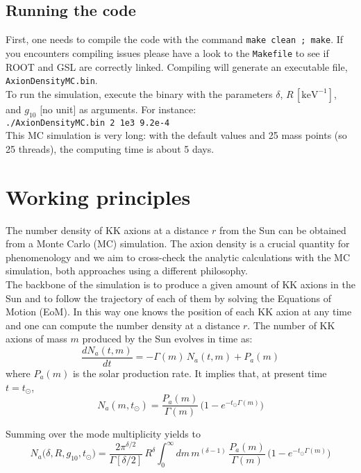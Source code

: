 \documentclass[a4paper]{article} %
\begin{document}
\subsection{Running the code}

First, one needs to compile the code with the command \texttt{make clean ; make}. If you encounters compiling issues please have a look to the \texttt{Makefile} to see if ROOT and GSL are correctly linked. Compiling will generate an executable file, \texttt{AxionDensityMC.bin}.\\

To run the simulation, execute the binary with the parameters $\delta$, $R\,\mathrm{[keV^{-1}]}$, and $g_{10}$ [no unit] as arguments. For instance:\\
\texttt{./AxionDensityMC.bin 2 1e3 9.2e-4}\\

This MC simulation is very long: with the default values and 25 mass points (so 25 threads), the computing time is about 5 days.

\section{Working principles}

The number density of KK axions at a distance $r$ from the Sun can be obtained from a Monte Carlo (MC) simulation. The axion density is a crucial quantity for phenomenology and we aim to cross-check the analytic calculations with the MC simulation, both approaches using a different philosophy.\\

The backbone of the simulation is to produce a given amount of KK axions in the Sun and to follow the trajectory of each of them by solving the Equations of Motion (EoM). In this way one knows the position of each KK axion at any time and one can compute the number density at a distance $r$.  The number of KK axions of mass $m$ produced by the Sun evolves in time as:
\begin{equation}
	\frac{dN_a(t,m)}{dt} = -\Gamma(m)\,N_a(t,m) + P_a(m)
\end{equation}
where $P_a(m)$ is the solar production rate. It implies that, at present time $t=t_\odot$,
\begin{equation}
	N_a(m, t_\odot) = \frac{P_a(m)}{\Gamma(m)}\,\bigg(1-e^{-t_\odot\Gamma(m)}\bigg)
\end{equation}

Summing over the mode multiplicity yields to
\begin{equation}
	N_a\big(\delta, R, g_{10}, t_\odot\big) = \frac{2\pi^{\delta/2}}{\Gamma[\delta/2]}\,R^{\delta}\int_0^\infty dm \, m^{(\delta-1)}\,  \frac{P_a(m)}{\Gamma(m)}\,\bigg(1-e^{-t_\odot\Gamma(m)}\bigg)
\end{equation}
\end{document}
